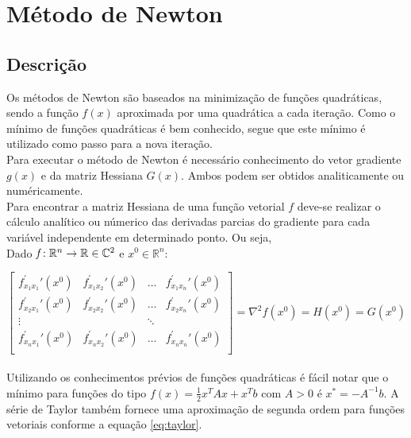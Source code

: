 \documentclass[a4paper,12pt,utf8x,notitlepage]{article}
\begin{document}
\section{Método de Newton}

\subsection{Descrição}

Os métodos de Newton são baseados na minimização de funções quadráticas, sendo a função $f(x)$ aproximada por uma quadrática a cada iteração. Como o mínimo de funções quadráticas é bem conhecido, segue que este mínimo é utilizado como passo para a nova iteração.\\

Para executar o método de Newton é necessário conhecimento do vetor gradiente $g(x)$ e da matriz Hessiana $G(x)$. Ambos podem ser obtidos analiticamente ou numéricamente.\\

Para encontrar a matriz Hessiana de uma função vetorial $f$ deve-se realizar o cálculo analítico ou númerico das derivadas parcias do gradiente para cada variável independente em determinado ponto. Ou seja,\\

Dado $\emph{f}:  \mathbb{R}^n \rightarrow  \mathbb{R} \in \mathbb{C}^2$ e $x^{0} \in \mathbb{R}^n$:

\begin{equation}
\begin{bmatrix}
f_{x_1x_1}^\prime\prime(x^0) & f_{x_1x_2}^\prime\prime(x^0) & \hdots & f_{x_1x_n}^\prime\prime(x^0)\\
f_{x_2x_1}^\prime\prime(x^0) & f_{x_2x_2}^\prime\prime(x^0) & \hdots & f_{x_2x_n}^\prime\prime(x^0)\\
\vdots & & \ddots &\\
f_{x_nx_1}^\prime\prime(x^0) & f_{x_nx_2}^\prime\prime(x^0) & \hdots & f_{x_nx_n}^\prime\prime(x^0)\\
\end{bmatrix} = \nabla^2f(x^0)=H(x^0) = G(x^0)
\end{equation}\\

Utilizando os conhecimentos prévios de funções quadráticas é fácil notar que o mínimo para funções do tipo $f(x)=\frac{1}{2}x^TAx + x^Tb$ com $A>0$ é $x^*=-A^{-1}b$. A série de Taylor também fornece uma aproximação de segunda ordem para funções vetoriais conforme a equação \eqref{eq:taylor}.\\
\end{document}
